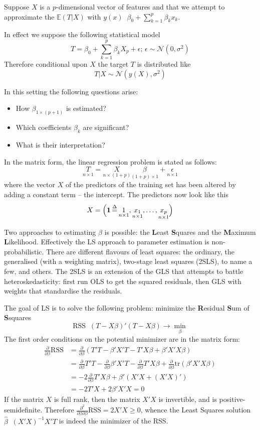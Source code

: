 \documentclass[a4paper]{article}
\newcommand{\brac}[1]{{\left ( #1 \right )}}
\newcommand{\induc}[1]{{\left . #1 \right \vert}}
\newcommand{\Ncal}{\mathcal{N}}
\newcommand{\Ex}[0]{{\mathbb{E}}}
\newcommand{\RSS}{\text{RSS}}
\newcommand{\tr}{\text{tr}}
\newcommand{\one}{\mathbf{1}}
\newcommand{\defn}{\mathop{\overset{\Delta}{=}}\nolimits}
\begin{document}
Suppose $X$ is a $p$-dimensional vector of features and that we attempt to approximate
the $\Ex(T\rvert X)$ with $y(x) \defn \beta_0 + \sum_{k=1}^p \beta_k x_k$.

In effect we suppose the following statistical model
\[T = \beta_0 + \sum_{k=1}^p \beta_k X_p + \epsilon;\,\epsilon\sim\Ncal(0,\sigma^2)\]
Therefore conditional upon $X$ the target $T$ is distributed like \[\induc{T}X\sim \Ncal(y(X),\sigma^2)\]

In this setting the following questions arise: \begin{itemize}
	\item How $\beta_{1\times(p+1)}$ is estimated?
	\item Which coefficients $\beta_k$ are significant?
	\item What is their interpretation?
\end{itemize}

In the matrix form, the linear regression problem is stated as follows:
\[
\underset{n\times 1}{T}
= \underset{n\times (1+p)}{X}\underset{(1+p)\times 1}{\beta}
+ \underset{n\times 1}{\epsilon}
\]
where the vector $X$ of the predictors of the training set has been altered by
adding a constant term -- the intercept. The predictors now look like this
\[
X = \Bigl( \one \defn \underset{n\times 1}{1}, \underset{n\times 1}{x_1}, \ldots, \underset{n\times 1}{x_p} \Bigr)
\]

Two approaches to estimating $\beta$ is possible:
the \textbf{L}east \textbf{S}quares and the \textbf{M}aximum \textbf{L}ikelihood.
Effectively the LS approach to parameter estimation is non-probabilistic.
There are different flavours of least squares: the ordinary, the generalised
(with a weighting matrix), two-stage least squares (2SLS), to name a few, and others.
The 2SLS is an extension of the GLS that attempts to battle heteroskedasticity:
first run OLS to get the squared residuals, then GLS with weights that standardise
the residuals.

The goal of LS is to solve the following problem:
minimize the \textbf{R}esidual \textbf{S}um of \textbf{S}squares
\[\RSS \defn \brac{T-X\beta}'\brac{T-X\beta} \to \min_\beta\]
The first order conditions on the potential minimizer are in the matrix form:
\begin{align*}
	\frac{\partial}{\partial \beta}\RSS &= \frac{\partial}{\partial \beta}\brac{T'T-\beta'X'T - T'X\beta + \beta'X'X\beta}\\
	&= \frac{\partial}{\partial \beta} T'T - \frac{\partial}{\partial \beta} \beta'X'T - \frac{\partial}{\partial \beta} T'X\beta + \frac{\partial}{\partial \beta} \tr\brac{\beta'X'X\beta}\\
	&= - 2 \frac{\partial}{\partial \beta} T'X\beta + \beta'\brac{X'X + \brac{X'X}'}\\
	&= - 2 T'X + 2 \beta'X'X = 0
\end{align*}
If the matrix $X$ is full rank, then the matrix $X'X$ is invertible, and is positive-semidefinite.
Therefore $\frac{\partial^2}{\partial \beta\partial \beta}\RSS = 2 X'X \geq 0$,
whence the Least Squares solution $\hat{\beta} \defn \brac{X'X}^{-1} X'T$ is indeed
the minimizer of the RSS.
\end{document}
